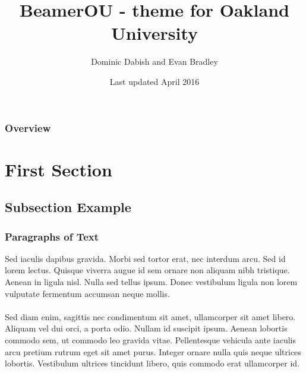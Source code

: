 \documentclass{beamer}
\title[Lisp machines]{BeamerOU - theme for Oakland University}
\author{Dominic Dabish and Evan Bradley}
\institute[OU]
	{
		Oakland University \\
		\medskip
		\textit{\{dadabish, edbradley\}@oakland.edu} 
	}
\date{Last updated April 2016}
\begin{document}
		
		\begin{frame}
			\titlepage %
		\end{frame}
		
		\begin{frame}
			\frametitle{Overview} %
			\tableofcontents %
		\end{frame}
		
		
		\section{First Section} %
		
		\subsection{Subsection Example} %
		
		\begin{frame}
			\frametitle{Paragraphs of Text}
			Sed iaculis dapibus gravida. Morbi sed tortor erat, nec interdum arcu. Sed id lorem lectus. Quisque viverra augue id sem ornare non aliquam nibh tristique. Aenean in ligula nisl. Nulla sed tellus ipsum. Donec vestibulum ligula non lorem vulputate fermentum accumsan neque mollis.\\~\\
			
			Sed diam enim, sagittis nec condimentum sit amet, ullamcorper sit amet libero. Aliquam vel dui orci, a porta odio. Nullam id suscipit ipsum. Aenean lobortis commodo sem, ut commodo leo gravida vitae. Pellentesque vehicula ante iaculis arcu pretium rutrum eget sit amet purus. Integer ornare nulla quis neque ultrices lobortis. Vestibulum ultrices tincidunt libero, quis commodo erat ullamcorper id.
		\end{frame}
		
\end{document}
